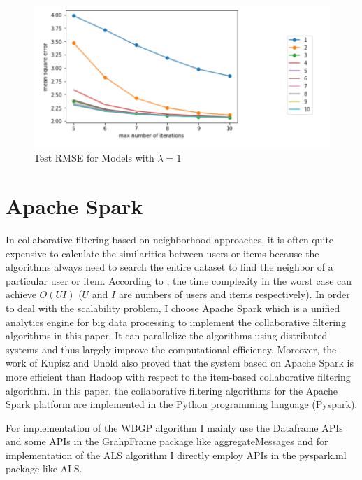 \documentclass{article}
\begin{document}
\begin{figure}[H]
	\centering
	\includegraphics[scale=0.5]{figs/figure4.png}
	\caption{Test RMSE for Models with $\lambda =1$} 
	\label{figure4}
\end{figure}

\section*{Apache Spark} %


\noindent In collaborative filtering based on neighborhood approaches, it is often quite expensive 
to calculate the similarities between users or items because the algorithms always need to search the 
entire dataset to find the neighbor of a particular user or item. According to \cite{kupisz2015collaborative}, the time complexity 
in the worst case can achieve $O(UI)$ ($U$ and $I$ are numbers of users and items respectively). In order to 
deal with the scalability problem, I choose Apache Spark which is a unified analytics engine for big 
data processing to implement the collaborative filtering algorithms in this paper. It can parallelize 
the algorithms using distributed systems and thus largely improve the computational efficiency. Moreover, 
the work of Kupisz and Unold \cite{kupisz2015collaborative} also proved that the system based on Apache Spark is more efficient than 
Hadoop with respect to the item-based collaborative filtering algorithm. In this paper, the collaborative 
filtering algorithms for the Apache Spark platform are implemented in the Python programming 
language (Pyspark).

\indent For implementation of the WBGP algorithm I mainly use the Dataframe APIs and some APIs 
in the GrahpFrame package like aggregateMessages and for implementation of the ALS algorithm I directly 
employ APIs in the pyspark.ml package like ALS.
\end{document}
